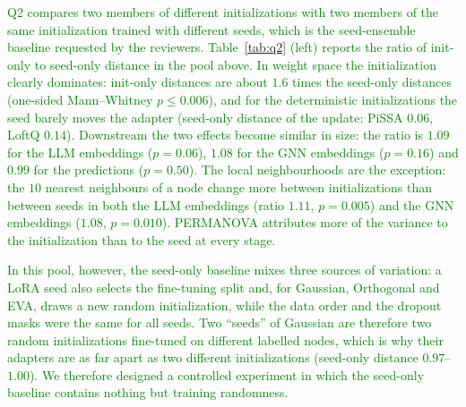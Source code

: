 \documentclass[a4paper,fleqn]{cas-sc}
\newcommand{\revthree}[1]{\textcolor{green}{#1}} %
\begin{document}
\revthree{Q2 compares two members of different initializations with two members of the same initialization trained with different seeds, which is the seed-ensemble baseline requested by the reviewers. Table~\ref{tab:q2} (left) reports the ratio of init-only to seed-only distance in the pool above. In weight space the initialization clearly dominates: init-only distances are about $1.6$ times the seed-only distances (one-sided Mann--Whitney $p\leq0.006$), and for the deterministic initializations the seed barely moves the adapter (seed-only distance of the update: PiSSA $0.06$, LoftQ $0.14$). Downstream the two effects become similar in size: the ratio is $1.09$ for the LLM embeddings ($p=0.06$), $1.08$ for the GNN embeddings ($p=0.16$) and $0.99$ for the predictions ($p=0.50$). The local neighbourhoods are the exception: the $10$ nearest neighbours of a node change more between initializations than between seeds in both the LLM embeddings (ratio $1.11$, $p=0.005$) and the GNN embeddings ($1.08$, $p=0.010$). PERMANOVA attributes more of the variance to the initialization than to the seed at every stage.}

\revthree{In this pool, however, the seed-only baseline mixes three sources of variation: a LoRA seed also selects the fine-tuning split and, for Gaussian, Orthogonal and EVA, draws a new random initialization, while the data order and the dropout masks were the same for all seeds. Two ``seeds'' of Gaussian are therefore two random initializations fine-tuned on different labelled nodes, which is why their adapters are as far apart as two different initializations (seed-only distance $0.97$--$1.00$). We therefore designed a controlled experiment in which the seed-only baseline contains nothing but training randomness.}
\end{document}
